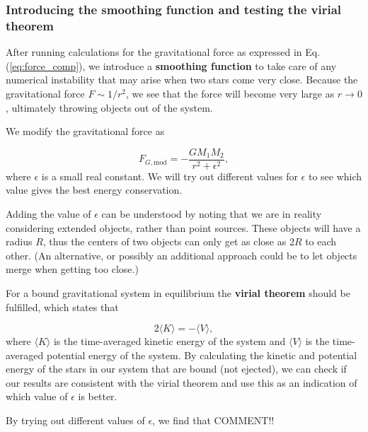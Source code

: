 \documentclass{article}
\begin{document}
\begin{multicols}{2}
\subsubsection{Introducing the smoothing function and testing the virial theorem}

After running calculations for the gravitational force as expressed in Eq. (\ref{eq:force_comp}), we introduce a \textbf{smoothing function} to take care of any numerical instability that may arise when two stars come very close. Because the gravitational force $F \sim 1/r^2$, we see that the force will become very large as $r \rightarrow 0$, ultimately throwing objects out of the system. 

We modify the gravitational force as

\begin{equation}\label{eq:force_mod}
	F_{G,\mathrm{mod}} = - \frac{G M_1 M_2}{r^2 + \epsilon^2},
\end{equation}
where $\epsilon$ is a small real constant. We will try out different values for $\epsilon$ to see which value gives the best energy conservation.

Adding the value of $\epsilon$ can be understood by noting that we are in reality considering extended objects, rather than point sources. These objects will have a radius $R$, thus the centers of two objects can only get as close as $2R$ to each other. (An alternative, or possibly an additional approach could be to let objects merge when getting too close.) 

For a bound gravitational system in equilibrium the \textbf{virial theorem} should be fulfilled, which states that

\begin{equation}\label{eq:vir}
	2 \langle K \rangle = - \langle V \rangle,
\end{equation}
where $\langle K \rangle$ is the time-averaged kinetic energy of the system and $\langle V \rangle$ is the time-averaged potential energy of the system. By calculating the kinetic and potential energy of the stars in our system that are bound (not ejected), we can check if our results are consistent with the virial theorem and use this as an indication of which value of $\epsilon$ is better.

By trying out different values of $\epsilon$, we find that COMMENT!!



\end{multicols}
\end{document}
